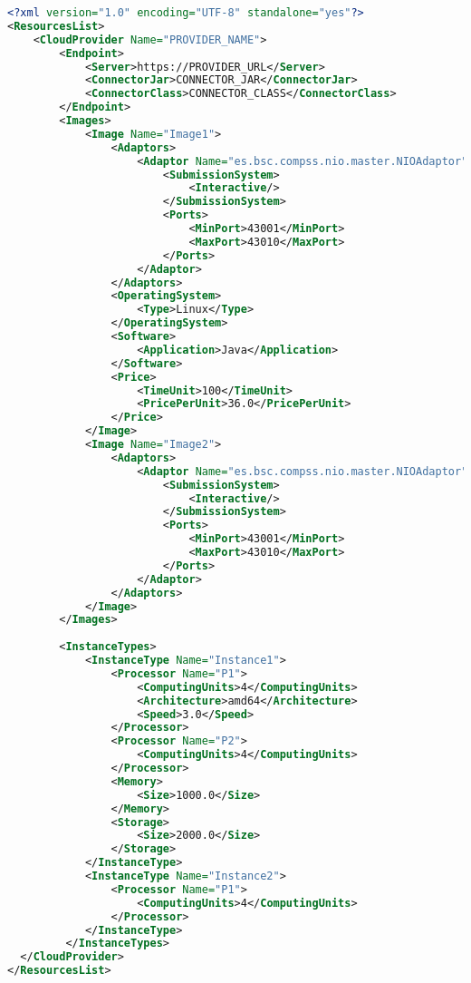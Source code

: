 \newpage

\begin{lstlisting}[language=xml]
<?xml version="1.0" encoding="UTF-8" standalone="yes"?>
<ResourcesList>
    <CloudProvider Name="PROVIDER_NAME">
        <Endpoint>
            <Server>https://PROVIDER_URL</Server>
            <ConnectorJar>CONNECTOR_JAR</ConnectorJar>
            <ConnectorClass>CONNECTOR_CLASS</ConnectorClass>
        </Endpoint>
        <Images>
            <Image Name="Image1">
                <Adaptors>
                    <Adaptor Name="es.bsc.compss.nio.master.NIOAdaptor">
                        <SubmissionSystem>
                            <Interactive/>
                        </SubmissionSystem>
                        <Ports>
                            <MinPort>43001</MinPort>
                            <MaxPort>43010</MaxPort>
                        </Ports>
                    </Adaptor>
                </Adaptors>
                <OperatingSystem>
                    <Type>Linux</Type>
                </OperatingSystem>
                <Software>
                    <Application>Java</Application>
                </Software>
                <Price>
                    <TimeUnit>100</TimeUnit>
                    <PricePerUnit>36.0</PricePerUnit>
                </Price>
            </Image>
            <Image Name="Image2">
                <Adaptors>
                    <Adaptor Name="es.bsc.compss.nio.master.NIOAdaptor">
                        <SubmissionSystem>
                            <Interactive/>
                        </SubmissionSystem>
                        <Ports>
                            <MinPort>43001</MinPort>
                            <MaxPort>43010</MaxPort>
                        </Ports>
                    </Adaptor>
                </Adaptors>
            </Image>
        </Images>
    
        <InstanceTypes>
            <InstanceType Name="Instance1">
                <Processor Name="P1">
                    <ComputingUnits>4</ComputingUnits>
                    <Architecture>amd64</Architecture>
                    <Speed>3.0</Speed>
                </Processor>
                <Processor Name="P2">
                    <ComputingUnits>4</ComputingUnits>
                </Processor>
                <Memory>
                    <Size>1000.0</Size>
                </Memory>
                <Storage>
                    <Size>2000.0</Size>
                </Storage>
            </InstanceType>
            <InstanceType Name="Instance2">
                <Processor Name="P1">
                    <ComputingUnits>4</ComputingUnits>
                </Processor>
            </InstanceType>
         </InstanceTypes>
  </CloudProvider>
</ResourcesList>
\end{lstlisting}

